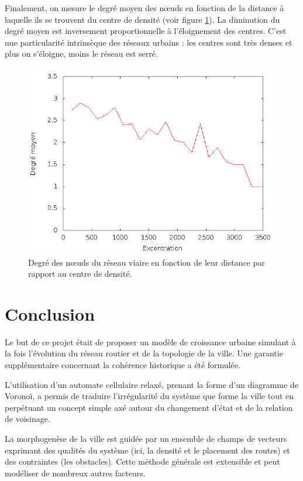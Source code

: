 \documentclass[10pt]{article}
\begin{document}
Finalement, on mesure le degré moyen des n\oe uds en fonction de la
distance à laquelle ils se trouvent du centre de densité (voir figure
\ref{fig:degree_distance}). La diminution du degré moyen est
inversement proportionnelle à l'éloignement des centres. C'est une
particularité intrinsèque des réseaux urbains : les centres sont très
denses et plus on s'éloigne, moins le réseau est serré.

\begin{figure}[H]
  \centering
  \includegraphics[width=.8\linewidth]{images/degree_distance.png}
  \caption{Degré des n\oe uds du réseau viaire en fonction de leur
    distance par rapport au centre de densité.}
  \label{fig:degree_distance}
\end{figure}

\section{Conclusion}

Le but de ce projet était de proposer un modèle de croissance urbaine
simulant à la fois l'évolution du réseau routier et de la topologie de
la ville. Une garantie supplémentaire concernant la cohérence
historique a été formulée.

L'utilisation d'un automate cellulaire relaxé, prenant la forme d'un
diagramme de Voronoï, a permis de traduire l'irrégularité du système
que forme la ville tout en perpétuant un concept simple axé autour du
changement d'état et de la relation de voisinage.

La morphogenèse de la ville est guidée par un ensemble de champs de
vecteurs exprimant des qualités du système (ici, la densité et le
placement des routes) et des contraintes (les obstacles). Cette
méthode générale est extensible et peut modéliser de nombreux autres
facteurs.
\end{document}
